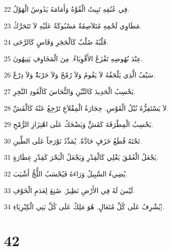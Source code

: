 \par 22 فِي عُنُقِهِ تَبِيتُ الْقُوَّةُ وَأَمَامَهُ يَدُوسُ الْهَوْلُ.
\par 23 مَطَاوِي لَحْمِهِ مُتَلاَصِقَةٌ مَسْبُوكَةٌ عَلَيْهِ لاَ تَتَحَرَّكُ.
\par 24 قَلْبُهُ صُلْبٌ كَالْحَجَرِ وَقَاسٍ كَالرَّحَى.
\par 25 عِنْدَ نُهُوضِهِ تَفْزَعُ الأَقْوِيَاءُ. مِنَ الْمَخَاوِفِ يَتِيهُونَ.
\par 26 سَيْفُ الَّذِي يَلْحَقُهُ لاَ يَقُومُ وَلاَ رُمْحٌ وَلاَ حَرْبَةًٌ وَلاَ دِرْعٌ.
\par 27 يَحْسِبُ الْحَدِيدَ كَالتِّبْنِ وَالنُّحَاسَ كَالْعُودِ النَّخِرِ.
\par 28 لاَ يَسْتَفِزُّهُ نُبْلُ الْقَوْسِ. حِجَارَةُ الْمِقْلاَعِ تَرْجِعُ عَنْهُ كَالْقَشِّ.
\par 29 يَحْسِبُ الْمِطْرَقَةَ كَقَشٍّ وَيَضْحَكُ عَلَى اهْتِزَازِ الرُّمْحِ.
\par 30 تَحْتَهُ قُطَعُ خَزَفٍ حَادَّةٌ. يُمَدِّدُ نَوْرَجاً عَلَى الطِّينِ.
\par 31 يَجْعَلُ الْعُمْقَ يَغْلِي كَالْقِدْرِ وَيَجْعَلُ الْبَحْرَ كَقِدْرِ عِطَارَةٍ.
\par 32 يُضِيءُ السَّبِيلُ وَرَاءَهُ فَيُحْسَبُ اللُّجُّ أَشْيَبَ.
\par 33 لَيْسَ لَهُ فِي الأَرْضِ نَظِيرٌ. صُنِعَ لِعَدَمِ الْخَوْفِ.
\par 34 يُشْرِفُ عَلَى كُلِّ مُتَعَالٍ. هُوَ مَلِكٌ عَلَى كُلِّ بَنِي الْكِبْرِيَاءِ].

\chapter{42}

